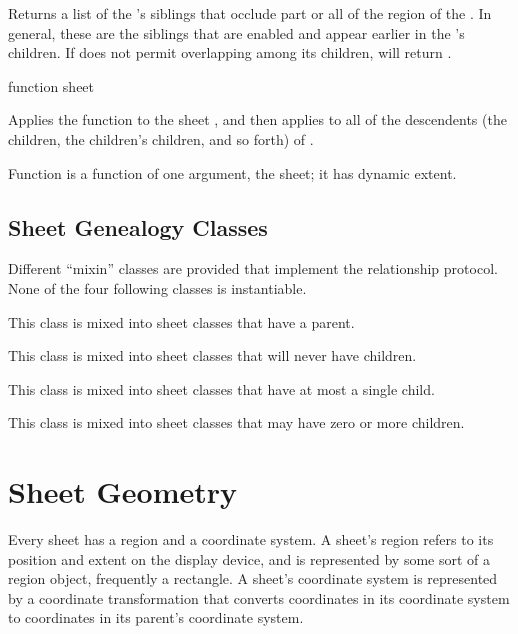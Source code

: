 Returns a list of the  's siblings that occlude part or
all of the region of the .  In general, these are the siblings that
are enabled and appear earlier in the  's children.  If
 does not permit overlapping among its children,
 will return .

\FreshOutputs

 {function sheet}

Applies the function  to the sheet , and then applies
 to all of the descendents (the children, the children's children,
and so forth) of .

Function is a function of one argument, the sheet; it has dynamic extent.


\subsection {Sheet Genealogy Classes}

Different ``mixin'' classes are provided that implement the relationship
protocol.  None of the four following classes is instantiable.


This class is mixed into sheet classes that have a parent.


This class is mixed into sheet classes that will never have children.


This class is mixed into sheet classes that have at most a single child.


This class is mixed into sheet classes that may have zero or more children.


\section {Sheet Geometry}

Every sheet has a region and a coordinate system.  A sheet's region refers to
its position and extent on the display device, and is represented by some sort
of a region object, frequently a rectangle.  A sheet's coordinate system is
represented by a coordinate transformation that converts coordinates in its
coordinate system to coordinates in its parent's coordinate system.

